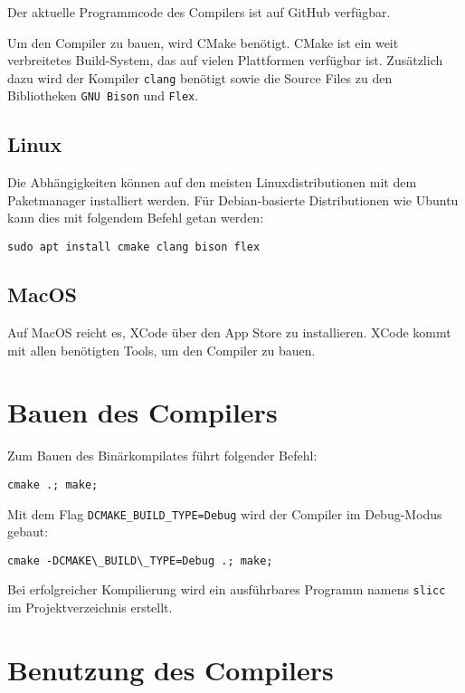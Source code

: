Der aktuelle Programmcode des Compilers ist auf GitHub verfügbar\cite{pascalernstSLICC2024}.

Um den Compiler zu bauen, wird CMake benötigt. CMake ist ein weit verbreitetes Build-System, das auf vielen Plattformen verfügbar ist.
Zusätzlich dazu wird der Kompiler \texttt{clang} benötigt sowie die Source Files zu den Bibliotheken \texttt{GNU Bison} und \texttt{Flex}.

\subsection{Linux}

Die Abhängigkeiten können auf den meisten Linuxdistributionen mit dem Paketmanager installiert werden.
Für Debian-basierte Distributionen wie Ubuntu kann dies mit folgendem Befehl getan werden:

\begin{lstlisting}
sudo apt install cmake clang bison flex
\end{lstlisting}

\subsection{MacOS}

Auf MacOS reicht es, XCode über den App Store zu installieren.
XCode kommt mit allen benötigten Tools, um den Compiler zu bauen.

\section{Bauen des Compilers}

Zum Bauen des Binärkompilates führt folgender Befehl:

\begin{lstlisting}
cmake .; make;
\end{lstlisting}

Mit dem Flag \texttt{DCMAKE\_BUILD\_TYPE=Debug} wird der Compiler im Debug-Modus gebaut:

\begin{lstlisting}
cmake -DCMAKE\_BUILD\_TYPE=Debug .; make;
\end{lstlisting}

Bei erfolgreicher Kompilierung wird ein ausführbares Programm namens \texttt{slicc} im Projektverzeichnis erstellt.

\section{Benutzung des Compilers}


